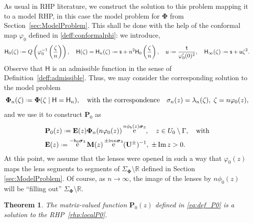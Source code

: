 \documentclass[reqno,a4paper,11pt]{amsart}
\DeclareMathOperator{\im}{Im}
\DeclareMathOperator{\ee}{\rm e}
\newcommand{\R}{\mathbb{R}}
\newcommand{\ii}{\mathrm{i}}
\newcommand*{\deff}{\mathrel{\vcenter{\baselineskip0.5ex \lineskiplimit0pt
                     \hbox{\scriptsize.}\hbox{\scriptsize.}}}%
                     =}
\renewcommand{\bm}{\mathbf}
\newcommand{\msf}{\mathsf}
\renewcommand{\sp}{\boldsymbol \sigma}
\newcommand{\sad}{\msf s}
\newcommand{\uad}{\msf u}
\newtheorem{theorem}{Theorem}[section]
\theoremstyle{definition}
\theoremstyle{remark}
\numberwithin{equation}{section}
\newcommand*{\defeq}{\mathrel{\vcenter{\baselineskip0.5ex \lineskiplimit0pt
                     \hbox{\scriptsize.}\hbox{\scriptsize.}}}%
                     =}
\begin{document}
As usual in RHP literature, we construct the solution to this problem mapping it to a model RHP, in this case the model problem for $\bm \Phi$ from Section~\ref{sec:ModelProblem}. This shall be done with the help of the conformal map $\varphi_0$ defined in \eqref{deff:conformalphi}: we introduce,
%
\begin{equation}\label{eq:defH_LocalAt0}
\msf H_0(\zeta) 
    \defeq Q \left( \varphi_0^{-1} \left( \frac{\zeta}{n}\right)\right), \quad
\msf H(\zeta) 
    = \msf H_n(\zeta)\defeq \sad + n^2 \msf H_0 \left( \frac{\zeta}{n}\right), \quad
%
\uad \defeq \frac{\msf t}{\varphi_0'(0)^2}, \quad
%
\msf H_\infty(\zeta) 
    \defeq \sad + \uad \zeta^2.
\end{equation}
%
Observe that $\msf H$ is an admissible function in the sense of Definition~\ref{deff:admissible}. Thus, we may consider the corresponding solution to the model problem
%
\begin{equation}\label{eq:lambdanmodel0}
\bm\Phi_n(\zeta)\deff \bm\Phi(\zeta\mid \msf H=\msf H_n),\quad \text{with the correspondence} \quad \sigma_n(z)=\lambda_n(\zeta), \; \zeta = n\varphi_0(z),
\end{equation}
%
and we use it to construct $\bm P_0$ as
%
\begin{equation}\label{eq:def_P0}
\begin{aligned}
    & \bm P_0(z)\deff \bm E(z)\bm\Phi_n(n\varphi_0(z))\ee^{n\phi_b(z)\sp_3},\quad z\in U_0\setminus \Gamma,\quad \text{with} \\ 
    & \bm E(z)\deff \ee^{-\msf h_0\sp_3} \bm M(z)\ee^{\pm \ii n\kappa\sp_3} (\bm U^\pm)^{-1}, \; \pm \im z>0.
\end{aligned}
\end{equation}
%
    At this point, we assume that the lenses were opened in such a way that $\varphi_0(z)$ maps the lens segments to segments of $\Sigma_{\bm \Phi} \setminus \R$ defined in Section \ref{sec:ModelProblem}. Of course, as $n \to \infty$, the image of the lenses by $n \phi_0(z)$ will be ``filling out'' $\Sigma_{\bm \Phi} \setminus \R$.

    \begin{theorem}
        The matrix-valued function $\bm P_0(z)$ defined in \eqref{eq:def_P0} is a solution to the RHP~\ref{rhp:localP0}.
    \end{theorem}
\end{document}
